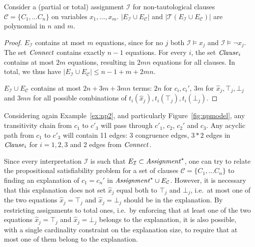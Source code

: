 \documentclass[smallextended]{svjour3}
\begin{document}
\begin{lemma}
Consider a (partial or total) assignment $\mathcal{I}$ for 
non-tautological clauses $\mathcal{C}= \{C_1, \dots C_n\}$ on variables  $x_1,\ldots, x_m$. $|E_{\mathcal{I}} \cup E_\mathcal{C}|$ and
$|\mathcal{T}(E_{\mathcal{I}} \cup E_\mathcal{C})|$ are polynomial in $n$ and
$m$.
\end{lemma}

\begin{proof}
$E_{\mathcal{I}}$ contains at most $m$ equations, since for no $j$ both $\mathcal{I} \models x_j$ and $\mathcal{I} \models \neg x_j$.
The set ${\it Connect}$ contains exactly $n-1$ equations.
For every $i$, the set ${\it Clause}_i$ contains at most $2m$ equations, resulting in $2mn$ equations for all clauses.
In total, we thus have $|E_{\mathcal{I}} \cup E_\mathcal{C}| \leq n-1 + m + 2mn$.

$E_{\mathcal{I}} \cup E_\mathcal{C}$ contains at most $2n + 3m + 3mn$ terms: $2n$ for $c_i,c_i'$, $3m$ for $\hat{x}_j,\top_j,\bot_j$ and $3mn$ for all possible combinations of $t_i(\hat{x}_j),t_i(\top_j),t_i(\bot_j)$.
\end{proof}

\noindent 
Considering again Example~\ref{ex:np2}, and particularly
Figure~\ref{fig:npmodel}, any transitivity chain from $c_1$ to
$c'_3$ will pass through $c'_1$, $c_2$, $c_2'$ and
$c_3$.  Any acyclic path from $c_1$ to $c'_3$ will contain 11
edges: 3 congruence edges, $3*2$ edges in ${\it Clause}_i$ for $i=1,2,3$
and 2 edges from ${\it Connect}$.

Since every interpretation $\mathcal{I}$ is such that $E_{\mathcal{I}} \subset
{\it Assignment}^\star$, one can try to relate the propositional satisfiability
problem for a set of clauses $\mathcal{C}= \{C_1, \dots C_n\}$ to finding an
explanation of $c_1 = c_n'$ in ${\it Assignment}^\star \cup
E_{\mathcal{C}}$.  However, it is necessary that this explanation does not set
$\hat{x}_j$ equal both to $\top_j$ and $\bot_j$, i.e.\ at most one of the two
equations $\hat{x}_j = \top_j$ and $\hat{x}_j = \bot_j$ should be in the
explanation.  By restricting assignments to total ones, i.e.\ by enforcing that
at least one of the two equations $\hat{x}_j = \top_j$ and $\hat{x}_j = \bot_j$
belongs to the explanation, it is also possible, with a single cardinality
constraint on the explanation size, to require that at most one of them 
belong to the explanation.
\end{document}
